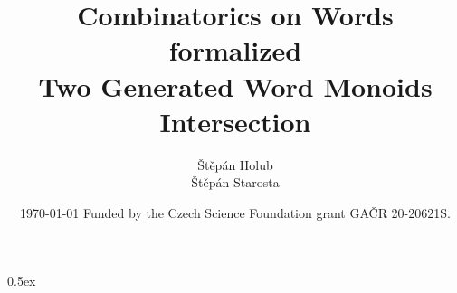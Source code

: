 \documentclass[11pt,a4paper]{report}
\begin{document}
\title{Combinatorics on Words formalized \\ Two Generated Word Monoids Intersection}
\author{Štěpán Holub \\ Štěpán Starosta }
  

 \date{ \today
 \vfill
  Funded by the Czech Science Foundation grant GA\v CR 20-20621S.}
  
\maketitle


\tableofcontents
\vspace{\baselineskip}

\parindent 0pt\parskip 0.5ex



\cleardoublepage
{}
{}
\renewcommand{\bibname}{References}


\end{document}
